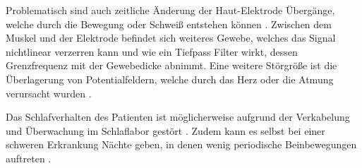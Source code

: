 Problematisch sind auch zeitliche Änderung der Haut-Elektrode Übergänge, welche durch die Bewegung oder Schweiß entstehen können \cite{Mehrkanal-BioimpedanzInstrumentierung,PRT}.
Zwischen dem Muskel und der Elektrode befindet sich weiteres Gewebe, welches das Signal nichtlinear verzerren kann und wie ein Tiefpass Filter wirkt, dessen Grenzfrequenz mit der Gewebedicke abnimmt. Eine weitere Störgröße ist die Überlagerung von Potentialfeldern, welche durch das Herz oder die Atmung verursacht wurden \cite{Moore,1x1}. \cite{physiology}

Das Schlafverhalten des Patienten ist möglicherweise aufgrund der Verkabelung und Überwachung im Schlaflabor gestört \cite{1x1}. Zudem kann es selbst bei einer schweren Erkrankung Nächte geben, in denen wenig periodische Beinbewegungen auftreten \cite{PDS}.
